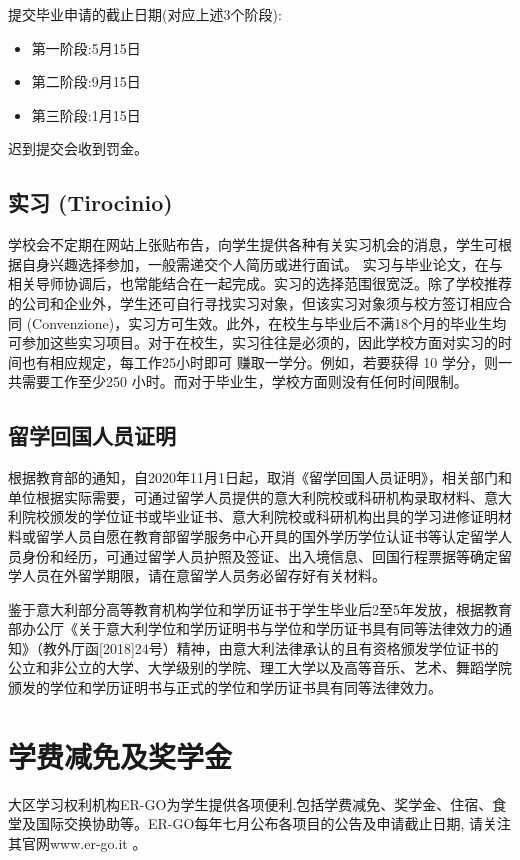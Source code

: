 \noindent 提交毕业申请的截止日期(对应上述3个阶段): 
\begin{itemize}
\item 第一阶段:5月15日
\item 第二阶段:9月15日
\item 第三阶段:1月15日 
\end{itemize}
迟到提交会收到罚金。

\subsection{实习 (Tirocinio)}
学校会不定期在网站上张贴布告，向学生提供各种有关实习机会的消息，学生可根据自身兴趣选择参加，一般需递交个人简历或进行面试。 实习与毕业论文，在与相关导师协调后，也常能结合在一起完成。实习的选择范围很宽泛。除了学校推荐的公司和企业外，学生还可自行寻找实习对象，但该实习对象须与校方签订相应合同 (Convenzione)，实习方可生效。此外，在校生与毕业后不满18个月的毕业生均可参加这些实习项目。对于在校生，实习往往是必须的，因此学校方面对实习的时间也有相应规定，每工作25小时即可 
赚取一学分。例如，若要获得 10 学分，则一共需要工作至少250 小时。而对于毕业生，学校方面则没有任何时间限制。 
\subsection{留学回国人员证明}
根据教育部的通知，自2020年11月1日起，取消《留学回国人员证明》，相关部门和单位根据实际需要，可通过留学人员提供的意大利院校或科研机构录取材料、意大利院校颁发的学位证书或毕业证书、意大利院校或科研机构出具的学习进修证明材料或留学人员自愿在教育部留学服务中心开具的国外学历学位认证书等认定留学人员身份和经历，可通过留学人员护照及签证、出入境信息、回国行程票据等确定留学人员在外留学期限，请在意留学人员务必留存好有关材料。


鉴于意大利部分高等教育机构学位和学历证书于学生毕业后2至5年发放，根据教育部办公厅《关于意大利学位和学历证明书与学位和学历证书具有同等法律效力的通知》（教外厅函[2018]24号）精神，由意大利法律承认的且有资格颁发学位证书的公立和非公立的大学、大学级别的学院、理工大学以及高等音乐、艺术、舞蹈学院颁发的学位和学历证明书与正式的学位和学历证书具有同等法律效力。



\section{学费减免及奖学金}

大区学习权利机构ER-GO为学生提供各项便利.包括学费减免、奖学金、住宿、食堂及国际交换协助等。ER-GO每年七月公布各项目的公告及申请截止日期, 请关注其官网www.er-go.it 。 

